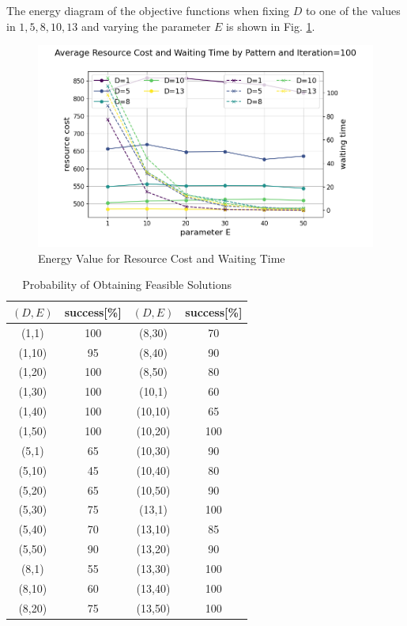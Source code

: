 \documentclass[conference]{IEEEtran}
\begin{document}
The energy diagram of the objective functions when fixing $D$ to one of the values in ${1, 5, 8, 10, 13}$ and varying the parameter $E$ is shown in Fig. \ref{fig:fig2}.

\begin{figure}[htbp]
\centerline{\includegraphics[scale=0.4]{./fig/D5.pdf}}
\caption{Energy Value for Resource Cost and Waiting Time}
\label{fig:fig2}
\end{figure}

\begin{table}[h] 
\centering 
\caption{Probability of Obtaining Feasible Solutions} 
\label{feasible} 
\begin{tabular}{|c|c|c|c|} \hline 
$(D,E)$ & success[\%] & $(D,E)$ & success[\%] \\ \hline 
(1,1) & 100 & (8,30) & 70 \\ \hline 
(1,10) & 95 & (8,40) & 90 \\ \hline 
(1,20) & 100 & (8,50) & 80 \\ \hline 
(1,30) & 100 & (10,1) & 60 \\ \hline 
(1,40) & 100 & (10,10) & 65 \\ \hline 
(1,50) & 100 & (10,20) & 100 \\ \hline 
(5,1) & 65 & (10,30) & 90 \\ \hline
 (5,10) & 45 & (10,40) & 80 \\ \hline
 (5,20) & 65 & (10,50) & 90 \\ \hline
 (5,30) & 75 & (13,1) & 100 \\ \hline 
 (5,40) & 70 & (13,10) & 85 \\ \hline
 (5,50) & 90 & (13,20) & 90 \\ \hline
 (8,1) & 55 & (13,30) & 100 \\ \hline
 (8,10) & 60 & (13,40) & 100 \\ \hline 
 (8,20) & 75 & (13,50) & 100 \\ \hline
 \end{tabular} 
 \end{table}
\end{document}
